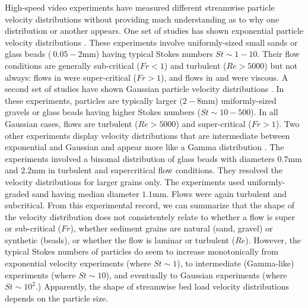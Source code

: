 High-speed video experiments have measured different streamwise particle velocity distributions without providing much understanding as to why one distribution or another appears.
One set of studies has shown exponential particle velocity distributions \citep{Charru2004,Lajeunesse2010,Roseberry2012,Seizilles2014,Fathel2015,Fathel2016}. 
These experiments involve uniformly-sized small sands or glass beads ($~0.05-2$mm) having typical Stokes numbers $St \sim 1-10$. Their flow conditions are generally sub-critical ($Fr<1$) and turbulent ($Re>5000$) but not always: flows in \citet{Lajeunesse2010} were super-critical ($Fr>1$), and flows in \citet{Charru2004} and \citet{Sezilles2014} were viscous.
A second set of studies have shown Gaussian particle velocity distributions \citep{Ancey2014,Heyman2016,Martin2012}. In these experiments, particles are typically larger ($2-8$mm) uniformly-sized gravels or glass beads having higher Stokes numbers ($St \sim 10-500$). In all Gaussian cases, flows are turbulent ($Re>5000$) and super-critical ($Fr>1$).
Two other experiments display velocity distributions that are intermediate between exponential and Gaussian and appear more like a Gamma distribution \citep{Houssais2012, Liu2019}. The \citet{Houssais2012} experiments involved a binomal distribution of glass beads with diameters $0.7$mm and $2.2$mm in turbulent and supercritical flow conditions. They resolved the velocity distributions for larger grains only. The \citet{Liu2019} experiments used uniformly-graded sand having median diameter $1.1$mm. Flows were again turbulent and subcritical.
From this experimental record, we can summarize that the shape of the velocity distribution does not consistentely relate to whether a flow is super or sub-critical ($Fr$), whether sediment grains are natural (sand, gravel) or synthetic (beads), or whether the flow is laminar or turbulent ($Re$). However, the typical Stokes numbers of particles do seem to increase monotonically from exponential velocity experiments (where $St \sim 1$), to intermediate (Gamma-like) experiments (where $St \sim 10$), and eventually to Gaussian experiments (where $St \sim 10^2$.) Apparently, the shape of streamwise bed load velocity distributions depends on the particle size.

